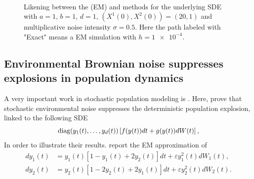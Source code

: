 \begin{figure}[tb]
	\centering
	\\
	\caption{
		 Likening between the (EM) and  methods for the underlying SDE
		with 
		$a=1$,
		$b=1$,
		$d=1$,
		$\left(X^{1}(0), X^{2}(0)\right) = (20,1)$
		and multiplicative noise intensity $\sigma = \num{0.5}$.
		Here the path labeled with "Exact" means a EM simulation with $h=\num{1e-4}$.
	}\label{fig:LotkaVolterraSDE}
\end{figure}
%
\restoregeometry
\subsection{Environmental Brownian noise suppresses explosions in population dynamics}
	A very important work in stochastic population modeling is \cite{Mao2002}. Here, \citeauthor*{Mao2002}
prove that stochastic environmental noise suppresses the deterministic population explosion, linked to the following SDE
\begin{equation}
	\operatorname{diag}(y_1(t),\dots, y_d(t))
	\left[
	f(y(t))dt + g(y(t))dW(t)
	\right],
\end{equation}
In order to illustrate their results. \citeauthor{Mao2002} report the EM approximation of
\begin{align}
	dy_1(t) &=
		y_1(t) \left[1 - y_1(t) + 2 y_2(t) \right]dt + \varepsilon y_1^2(t) dW_1(t), \label{eqn:MaoPopDynSDE1}\\
	dy_2(t) &=
		y_2(t) \left[1 - 2 y_2(t) + 2 y_1(t)\right]dt + \varepsilon y_2^2(t) dW_2(t) \label{eqn:MaoPopDynSDE2}.
\end{align}
%

